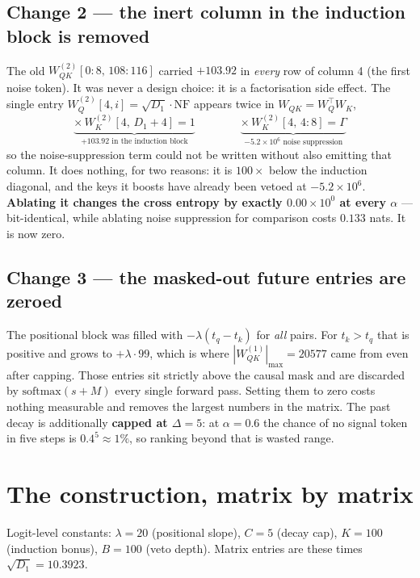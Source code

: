 \documentclass[11pt]{article}
\newcommand{\Wqk}{W_{QK}}
\newcommand{\Wq}{W_Q}
\newcommand{\Wk}{W_K}
\begin{document}
\subsection{Change 2 --- the inert column in the induction block is removed}

The old $\Wqk^{(2)}[0{:}8,\,108{:}116]$ carried $+103.92$ in \emph{every} row of column 4
(the first noise token). It was never a design choice: it is a factorisation side effect. The
single entry $\Wq^{(2)}[4,i]=\sqrt{D_1}\cdot\text{NF}$ appears twice in $\Wqk=\Wq^\top\Wk$,
\[
\underbrace{\times\, \Wk^{(2)}[4,\,D_1{+}4]=1}_{\textstyle +103.92 \text{ in the induction block}}
\qquad\qquad
\underbrace{\times\, \Wk^{(2)}[4,\,4{:}8]=\Gamma}_{\textstyle -5.2\times10^{6}\text{ noise suppression}}
\]
so the noise-suppression term could not be written without also emitting that column. It does
nothing, for two reasons: it is $100\times$ below the induction diagonal, and the keys it boosts
have already been vetoed at $-5.2\times10^{6}$. \textbf{Ablating it changes the cross entropy by
exactly $0.00\times10^{0}$ at every $\alpha$} --- bit-identical, while ablating noise suppression
for comparison costs $0.133$ nats. It is now zero.

\subsection{Change 3 --- the masked-out future entries are zeroed}

The positional block was filled with $-\lambda(t_q-t_k)$ for \emph{all} pairs. For $t_k>t_q$ that
is positive and grows to $+\lambda\cdot99$, which is where $|\Wqk^{(1)}|_{\max}=20577$ came from
even after capping. Those entries sit strictly above the causal mask and are discarded by
$\text{softmax}(s+M)$ every single forward pass. Setting them to zero costs nothing measurable and
removes the largest numbers in the matrix. The past decay is additionally \textbf{capped at
$\Delta=5$}: at $\alpha=0.6$ the chance of no signal token in five steps is $0.4^5\approx1\%$, so
ranking beyond that is wasted range.

\section{The construction, matrix by matrix}

Logit-level constants: $\lambda=20$ (positional slope), $C=5$ (decay cap), $K=100$ (induction
bonus), $B=100$ (veto depth). Matrix entries are these times $\sqrt{D_1}=10.3923$.
\end{document}
